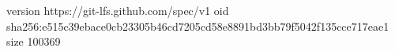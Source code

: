 version https://git-lfs.github.com/spec/v1
oid sha256:e515c39ebace0cb23305b46cd7205cd58e8891bd3bb79f5042f135cce717eae1
size 100369
